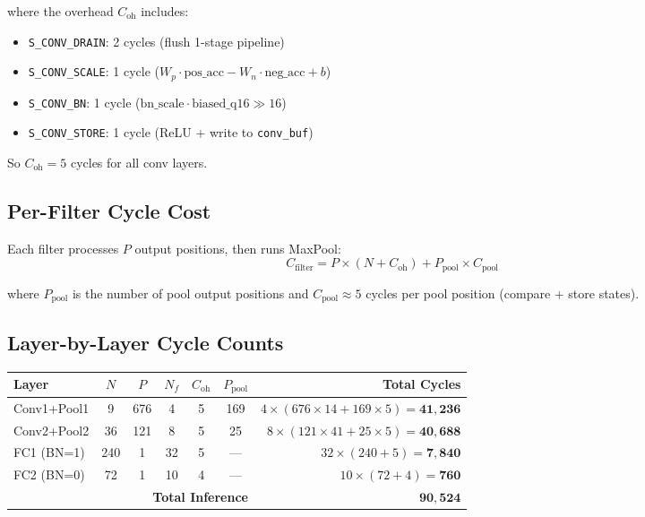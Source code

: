 \documentclass[11pt,a4paper]{article}
\begin{document}
where the overhead $C_{\text{oh}}$ includes:
\begin{itemize}[nosep]
    \item \texttt{S\_CONV\_DRAIN}: 2 cycles (flush 1-stage pipeline)
    \item \texttt{S\_CONV\_SCALE}: 1 cycle ($W_p \cdot \text{pos\_acc} - W_n \cdot \text{neg\_acc} + b$)
    \item \texttt{S\_CONV\_BN}: 1 cycle ($\text{bn\_scale} \cdot \text{biased\_q16} \gg 16$)
    \item \texttt{S\_CONV\_STORE}: 1 cycle (ReLU + write to \texttt{conv\_buf})
\end{itemize}
So $C_{\text{oh}} = 5$ cycles for all conv layers.

\subsection{Per-Filter Cycle Cost}

Each filter processes $P$ output positions, then runs MaxPool:
\begin{equation}
C_{\text{filter}} = P \times (N + C_{\text{oh}}) + P_{\text{pool}} \times C_{\text{pool}}
\end{equation}

where $P_{\text{pool}}$ is the number of pool output positions and
$C_{\text{pool}} \approx 5$ cycles per pool position (compare + store states).

\subsection{Layer-by-Layer Cycle Counts}

\begin{center}
\begin{tabular}{lcccccr}
\toprule
\textbf{Layer} & $N$ & $P$ & $N_f$ & $C_{\text{oh}}$ & $P_{\text{pool}}$ & \textbf{Total Cycles} \\
\midrule
Conv1+Pool1 & 9 & 676 & 4 & 5 & 169 &
    $4 \times (676 \times 14 + 169 \times 5) = \mathbf{41{,}236}$ \\[4pt]
Conv2+Pool2 & 36 & 121 & 8 & 5 & 25 &
    $8 \times (121 \times 41 + 25 \times 5) = \mathbf{40{,}688}$ \\[4pt]
FC1 (BN=1) & 240 & 1 & 32 & 5 & — &
    $32 \times (240 + 5) = \mathbf{7{,}840}$ \\[4pt]
FC2 (BN=0) & 72 & 1 & 10 & 4 & — &
    $10 \times (72 + 4) = \mathbf{760}$ \\
\midrule
\multicolumn{6}{r}{\textbf{Total Inference}} & $\mathbf{90{,}524}$ \\
\bottomrule
\end{tabular}
\end{center}
\end{document}
